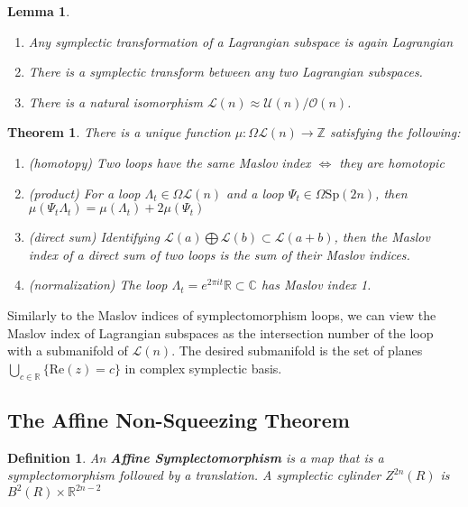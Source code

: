 \documentclass{article}
\newtheorem{thm}{Theorem}
\newtheorem{defn}{Definition}
\newtheorem{lem}{Lemma}
\begin{document}
\begin{lem}

\begin{enumerate}
    \item Any symplectic transformation of a Lagrangian subspace is again Lagrangian
    \item There is a symplectic transform between any two Lagrangian subspaces.
    \item There is a natural isomorphism $\mathcal{L}(n) \approx \mathcal{U}(n)/\mathcal{O}(n)$.
\end{enumerate}

\end{lem}

\begin{thm}

There is a unique function $\mu: \Omega \mathcal{L}(n) \to \mathbb{Z}$ satisfying the following:

\begin{enumerate}
    \item (homotopy) Two loops have the same Maslov index $\iff$ they are homotopic
    \item (product) For a loop $\Lambda_t \in \Omega \mathcal{L}(n)$ and a loop $\Psi_t \in \Omega \mathrm{Sp}(2n)$, then $\mu(\Psi_t \Lambda_t) = \mu(\Lambda_t) + 2 \mu(\Psi_t)$
    \item (direct sum) Identifying $\mathcal{L}(a) \bigoplus \mathcal{L}(b) \subset \mathcal{L}(a+b)$, then the Maslov index of a direct sum of two loops is the sum of their Maslov indices.
    \item (normalization)  The loop $\Lambda_t = e^{2 \pi i t} \mathbb{R} \subset \mathbb{C}$ has Maslov index 1.
    
\end{enumerate}

\end{thm}

Similarly to the Maslov indices of symplectomorphism loops, we can view the Maslov index of Lagrangian subspaces as the intersection number of the loop with a submanifold of $\mathcal{L}(n)$. The desired submanifold is the set of planes $\bigcup_{c \in \mathbb{R}} \{\mathrm{Re}(z) = c\}$ in complex symplectic basis.


\subsection{The Affine Non-Squeezing Theorem}

\begin{defn}

An \textbf{Affine Symplectomorphism} is a map that is a symplectomorphism followed by a translation. A symplectic cylinder $Z^{2n}(R)$ is $B^2 (R) \times \mathbb{R}^{2n-2}$

\end{defn}
\end{document}
